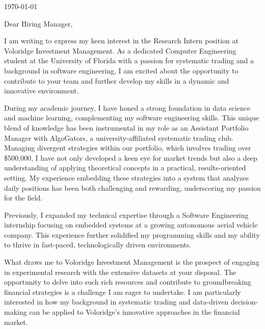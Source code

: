 \documentclass{ExpressiveCoverLetter}
\begin{document}
\coverletterheader[
    firstname=Cole,
    middleinitial=H,
    lastname=Rottenberg,
    email=cole.rottenberg@gmail.com,
    phone=407-961-0600,
    linkedin=cole-rottenberg,
    github=colerottenberg,
    city=Orlando,
    state=Florida,
]

\vspace{0.25in}
\today
\vspace{0.15in}

Dear Hiring Manager,

I am writing to express my keen interest in the Research Intern position at Voloridge Investment Management. As a dedicated Computer Engineering student at the University of Florida with a passion for systematic trading and a background in software engineering, I am excited about the opportunity to contribute to your team and further develop my skills in a dynamic and innovative environment.

During my academic journey, I have honed a strong foundation in data
science and machine learning, complementing my software engineering
skills.
This unique blend of knowledge has been instrumental in my role as an
Assistant Portfolio Manager with AlgoGators, a university-affiliated
systematic trading club.
Managing divergent strategies within our portfolio, which
involves trading over \$500,000, I have not only developed a keen eye for
market trends but also a deep understanding of applying theoretical
concepts in a practical, results-oriented setting.
My experience embedding these strategies into a system that analyzes daily positions has been both challenging and rewarding, underscoring my passion for the field.

Previously, I expanded my technical expertise through a Software
Engineering internship focusing on embedded systems at a growing
autonomous aerial vehicle company.
This experience further solidified my programming skills and my ability to thrive in fast-paced, technologically driven environments.

What draws me to Voloridge Investment Management is the prospect of
engaging in experimental research with the extensive datasets at your
disposal.
The opportunity to delve into such rich resources and contribute to
groundbreaking financial strategies is a challenge I am eager to
undertake.
I am particularly interested in how my background in systematic trading and data-driven decision-making can be applied to Voloridge's innovative approaches in the financial market.
\end{document}
